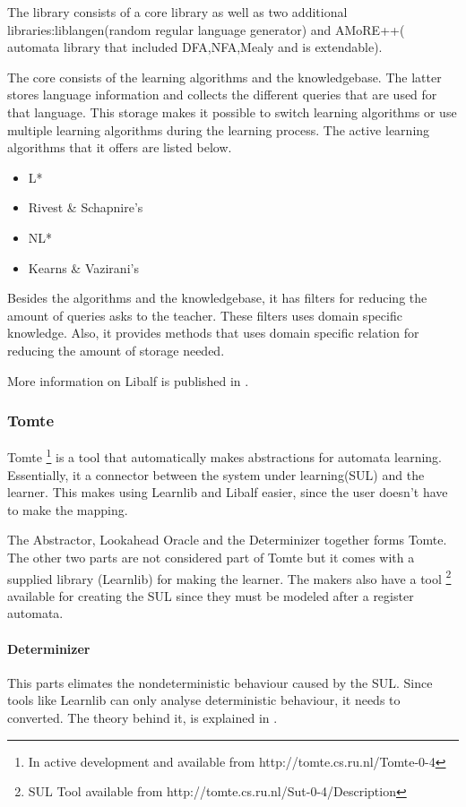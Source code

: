 \documentclass[multi,crop=false,class=article]{standalone}
\begin{document}
The library consists of a core library as well as two additional libraries:liblangen(random regular language generator) and AMoRE++(
automata library that included DFA,NFA,Mealy and is extendable).

The core consists of the learning algorithms and the knowledgebase. The latter 
stores language information and collects the different queries that are used 
for that language. This storage makes it possible to switch learning algorithms 
or use multiple learning algorithms during the learning process. The active 
learning algorithms that it offers are listed below.

\begin{itemize}
	\item L*
	\item Rivest \& Schapnire's
	\item NL*
	\item Kearns \& Vazirani's
\end{itemize}

Besides the algorithms and the knowledgebase, it has filters for reducing the 
amount of queries asks to the teacher. These filters uses domain specific 
knowledge. %
Also, it provides methods that uses domain specific relation for reducing the 
amount of storage needed. 

More information on Libalf is published in \cite{Bollig2010}.

\subsubsection{Tomte}
Tomte \footnote{In active development and available from 
http://tomte.cs.ru.nl/Tomte-0-4} is a tool that automatically makes 
abstractions for automata learning. Essentially, it a connector between the 
system under learning(SUL) and the learner. This makes using Learnlib and 
Libalf easier, since the user doesn't have to make the mapping.


The Abstractor, Lookahead Oracle and the Determinizer together forms Tomte. The 
other two parts are not considered part
of Tomte but it comes with a supplied library (Learnlib) for making the learner.
The makers also have a tool \footnote{SUL Tool available from 
http://tomte.cs.ru.nl/Sut-0-4/Description} available for creating the SUL since 
they must be modeled after a register automata.
 
\paragraph{Determinizer}
This parts elimates the nondeterministic behaviour caused by the SUL. Since 
tools like Learnlib can only analyse deterministic behaviour, it needs to 
converted. The theory behind it, is explained in \cite{Aarts2015}.
\end{document}
